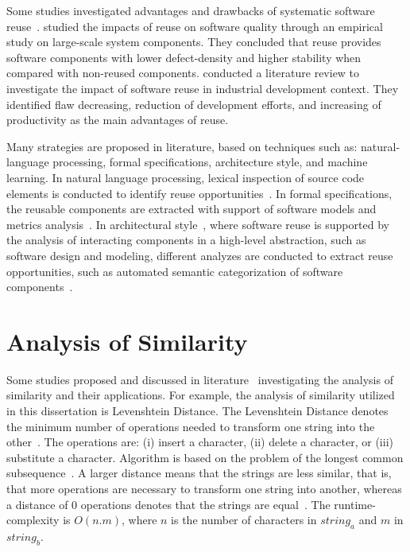 Some studies investigated advantages and drawbacks of systematic software reuse~\citep{mohagheghi2007quality,mohagheghi2004empirical}. \cite{mohagheghi2004empirical} studied the impacts of reuse on software quality through an empirical study on large-scale system components. They concluded that reuse provides software components with lower defect-density and higher stability when compared with non-reused components. \cite{mohagheghi2007quality} conducted a literature review to investigate the impact of software reuse in industrial development context. They identified flaw decreasing, reduction of development efforts, and increasing of productivity as the main advantages of reuse.


Many strategies are proposed in literature, based on techniques such as: natural-language processing, formal specifications, architecture  style, and  machine learning. In natural language processing, lexical inspection of source code elements is conducted to identify reuse opportunities~\citep{maarek1991information}. In formal specifications, the reusable components are extracted with support of software models and metrics analysis~\citep{caldiera1991identifying}. In architectural style~\citep{monroe1996style}, where software reuse is supported by the analysis of interacting components in a high-level abstraction, such as software design and modeling,  different analyzes are conducted to extract reuse opportunities, such as automated semantic categorization of software components~\citep{Kawaguchi2004}.


\section{Analysis of Similarity}
\label{sec:analysisSimilarity}

Some studies proposed and discussed in literature~\citep{Kukich:1992,Navarro:2001,Fluri:2007} investigating the analysis of similarity and their applications. For example, the analysis of similarity utilized in this dissertation is Levenshtein Distance.  The Levenshtein Distance denotes the minimum number of operations needed to transform one string into the other~\citep{levenshtein1966}. The operations are: (i) insert a character, (ii) delete a character, or (iii) substitute a character. Algorithm is based on the problem of the longest common subsequence~\citep{levenshtein1966}. A larger distance means that the strings are less similar, that is, that more operations are necessary to transform one string into another, whereas a distance of 0 operations denotes that the strings are equal~\citep{Fluri:2007}. The runtime-complexity is $O(n.m)$, where $n$ is the
number of characters in $string_a$ and $m$ in $string_b$.

